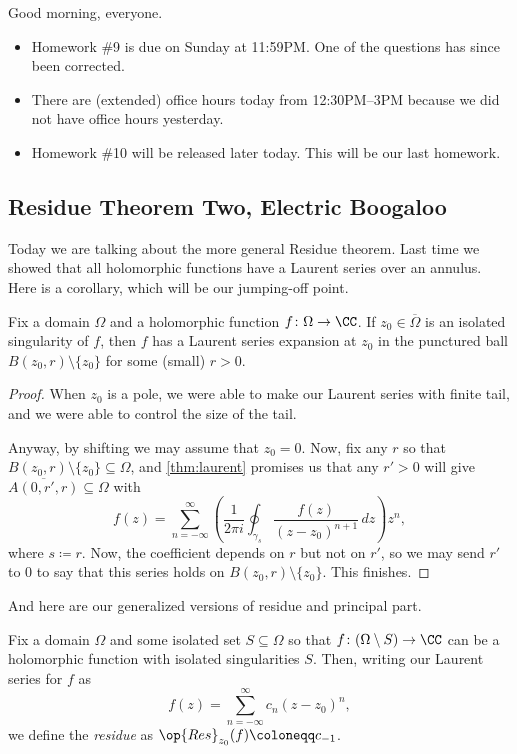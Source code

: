 
Good morning, everyone.
\begin{itemize}
	\item Homework \#9 is due on Sunday at 11:59PM. One of the questions has since been corrected.
	\item There are (extended) office hours today from 12:30PM--3PM because we did not have office hours yesterday.
	\item Homework \#10 will be released later today. This will be our last homework.
\end{itemize}

\subsection{Residue Theorem Two, Electric Boogaloo}
Today we are talking about the more general Residue theorem. Last time we showed that all holomorphic functions have a Laurent series over an annulus. Here is a corollary, which will be our jumping-off point.
\begin{corollary}
	Fix a domain $\Omega$ and a holomorphic function $f\colon\Omega\to\CC$. If $z_0\in\overline\Omega$ is an isolated singularity of $f$, then $f$ has a Laurent series expansion at $z_0$ in the punctured ball $B(z_0,r)\setminus\{z_0\}$ for some (small) $r>0$.
\end{corollary}
\begin{proof}
	When $z_0$ is a pole, we were able to make our Laurent series with finite tail, and we were able to control the size of the tail.

	Anyway, by shifting we may assume that $z_0=0$. Now, fix any $r$ so that $B(z_0,r)\setminus\{z_0\}\subseteq\Omega$, and \autoref{thm:laurent} promises us that any $r'>0$ will give $\overline{A(0,r',r)}\subseteq\Omega$ with
	\[f(z)=\sum_{n=-\infty}^\infty\left(\frac1{2\pi i}\oint_{\gamma_s}\frac{f(z)}{(z-z_0)^{n+1}}\,dz\right)z^n,\]
	where $s\coloneqq r$. Now, the coefficient depends on $r$ but not on $r'$, so we may send $r'$ to $0$ to say that this series holds on $B(z_0,r)\setminus\{z_0\}$. This finishes.
\end{proof}
And here are our generalized versions of residue and principal part.
\begin{definition}[Residue]
	Fix a domain $\Omega$ and some isolated set $S\subseteq\Omega$ so that $f\colon(\Omega\setminus S)\to\CC$ can be a holomorphic function with isolated singularities $S$. Then, writing our Laurent series for $f$ as
	\[f(z)=\sum_{n=-\infty}^\infty c_n(z-z_0)^n,\]
	we define the \textit{residue} as $\op{Res}_{z_0}(f)\coloneqq c_{-1}$.
\end{definition}
